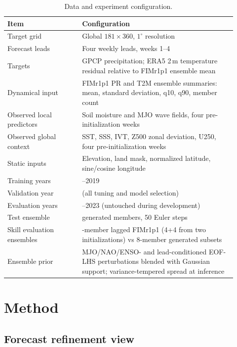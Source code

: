 \documentclass[11pt]{article}
\newcommand{\modelshort}{FIMr1p1}
\begin{document}
\begin{table}[t]
\centering
\caption{Data and experiment configuration.}
\label{tab:data-config}
\small
\begin{tabular}{>{\raggedright\arraybackslash}p{0.30\linewidth}>{\raggedright\arraybackslash}p{0.62\linewidth}}
\toprule
Item & Configuration \\
\midrule
Target grid & Global $181\times360$, $1^\circ$ resolution \\
Forecast leads & Four weekly leads, weeks 1--4 \\
Targets & GPCP precipitation; ERA5 2\,m temperature residual relative to \modelshort{} ensemble mean \\
Dynamical input & \modelshort{} PR and T2M ensemble summaries: mean, standard deviation, q10, q90, member count \\
Observed local predictors & Soil moisture and MJO wave fields, four pre-initialization weeks \\
Observed global context & SST, SSS, IVT, Z500 zonal deviation, U250, four pre-initialization weeks \\
Static inputs & Elevation, land mask, normalized latitude, sine/cosine longitude \\
Training years & 1999--2019 \\
Validation year & 2020 (all tuning and model selection) \\
Evaluation years & 2021--2023 (untouched during development) \\
Test ensemble & 90 generated members, 50 Euler steps \\
Skill evaluation ensembles & 8-member lagged \modelshort{} (4+4 from two initializations) vs 8-member generated subsets \\
Ensemble prior & MJO/NAO/ENSO- and lead-conditioned EOF-LHS perturbations blended with Gaussian support; variance-tempered spread at inference \\
\bottomrule
\end{tabular}
\end{table}

\section{Method}
\label{sec:method}

\subsection{Forecast refinement view}
\end{document}
